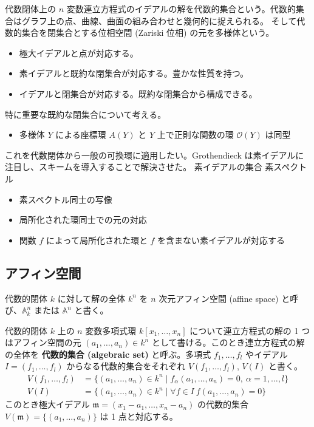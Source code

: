 \documentclass[uplatex,dvipdfmx,a4paper,11pt]{jlreq}
\renewcommand{\AA}{\mathbb{A}}
\newcommand{\mm}{\mathfrak{m}}
\numberwithin{equation}{section}
\theoremstyle{definition}
\begin{document}
代数閉体上の $n$ 変数連立方程式のイデアルの解を代数的集合という。代数的集合はグラフ上の点、曲線、曲面の組み合わせと幾何的に捉えられる。
そして代数的集合を閉集合とする位相空間 (Zariski 位相) の元を多様体という。
\begin{itemize}
  \item 極大イデアルと点が対応する。
  \item 素イデアルと既約な閉集合が対応する。豊かな性質を持つ。
  \item イデアルと閉集合が対応する。既約な閉集合から構成できる。
\end{itemize}
特に重要な既約な閉集合について考える。
\begin{itemize}
  \item 多様体 $Y$ による座標環 $A(Y)$ と $Y$ 上で正則な関数の環 $\mathcal{O}(Y)$ は同型
\end{itemize}

これを代数閉体から一般の可換環に適用したい。Grothendieck は素イデアルに注目し、スキームを導入することで解決させた。
素イデアルの集合 素スペクトル
\begin{itemize}
  \item 素スペクトル同士の写像
  \item 局所化された環同士での元の対応
  \item 関数 $f$ によって局所化された環と $f$ を含まない素イデアルが対応する
\end{itemize}

\subsection{アフィン空間}
\begin{definition}[アフィン空間]
  代数的閉体 $k$ に対して解の全体 $k^n$ を $n$ 次元アフィン空間 (affine space) と呼び、$\AA_k^n$ または $\AA^n$ と書く。
\end{definition}
代数的閉体 $k$ 上の $n$ 変数多項式環 $k[x_1,\ldots,x_n]$ について連立方程式の解の 1 つはアフィン空間の元 $(a_1,\ldots,a_n)\in k^n$ として書ける。このとき連立方程式の解の全体を \textbf{代数的集合 (algebraic set)} と呼ぶ。多項式 $f_1,\ldots,f_l$ やイデアル $I = (f_1,\ldots,f_l)$ からなる代数的集合をそれぞれ $V(f_1,\ldots,f_l)$, $V(I)$ と書く。
\begin{align}
  V(f_1, \ldots, f_l) & = \lbrace(a_1, \ldots, a_n)\in k^n\mid f_\alpha(a_1,\ldots,a_n) = 0,\ \alpha = 1,\ldots,l\rbrace \\
  V(I)                & = \lbrace(a_1, \ldots, a_n)\in k^n\mid \forall f\in I \ f(a_1,\ldots,a_n) = 0\rbrace
\end{align}
このとき極大イデアル $\mm = (x_1 - a_1,\ldots,x_n - a_n)$ の代数的集合 $V(\mm) = \lbrace(a_1,\ldots,a_n)\rbrace$ は 1 点と対応する。
\end{document}
